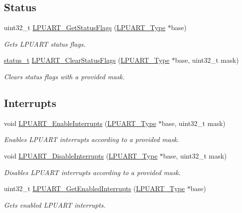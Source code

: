 \subsection*{Status}
\begin{DoxyCompactItemize}
\item 
uint32\+\_\+t \mbox{\hyperlink{group__lpuart__driver_gab83db963591b116f90daf3e24118cb09}{L\+P\+U\+A\+R\+T\+\_\+\+Get\+Status\+Flags}} (\mbox{\hyperlink{struct_l_p_u_a_r_t___type}{L\+P\+U\+A\+R\+T\+\_\+\+Type}} $\ast$base)
\begin{DoxyCompactList}\small\item\em Gets L\+P\+U\+A\+RT status flags. \end{DoxyCompactList}\item 
\mbox{\hyperlink{group__ksdk__common_gaaabdaf7ee58ca7269bd4bf24efcde092}{status\+\_\+t}} \mbox{\hyperlink{group__lpuart__driver_gac6bcdb29d31a2addb8d80d98855ba147}{L\+P\+U\+A\+R\+T\+\_\+\+Clear\+Status\+Flags}} (\mbox{\hyperlink{struct_l_p_u_a_r_t___type}{L\+P\+U\+A\+R\+T\+\_\+\+Type}} $\ast$base, uint32\+\_\+t mask)
\begin{DoxyCompactList}\small\item\em Clears status flags with a provided mask. \end{DoxyCompactList}\end{DoxyCompactItemize}
\subsection*{Interrupts}
\begin{DoxyCompactItemize}
\item 
void \mbox{\hyperlink{group__lpuart__driver_gab5998ebb0dc457f0864c84c16f83d745}{L\+P\+U\+A\+R\+T\+\_\+\+Enable\+Interrupts}} (\mbox{\hyperlink{struct_l_p_u_a_r_t___type}{L\+P\+U\+A\+R\+T\+\_\+\+Type}} $\ast$base, uint32\+\_\+t mask)
\begin{DoxyCompactList}\small\item\em Enables L\+P\+U\+A\+RT interrupts according to a provided mask. \end{DoxyCompactList}\item 
void \mbox{\hyperlink{group__lpuart__driver_ga2540406e4a338199acddaa828829cad8}{L\+P\+U\+A\+R\+T\+\_\+\+Disable\+Interrupts}} (\mbox{\hyperlink{struct_l_p_u_a_r_t___type}{L\+P\+U\+A\+R\+T\+\_\+\+Type}} $\ast$base, uint32\+\_\+t mask)
\begin{DoxyCompactList}\small\item\em Disables L\+P\+U\+A\+RT interrupts according to a provided mask. \end{DoxyCompactList}\item 
uint32\+\_\+t \mbox{\hyperlink{group__lpuart__driver_ga172b524bae8bacc6dc95d9daf82c97b5}{L\+P\+U\+A\+R\+T\+\_\+\+Get\+Enabled\+Interrupts}} (\mbox{\hyperlink{struct_l_p_u_a_r_t___type}{L\+P\+U\+A\+R\+T\+\_\+\+Type}} $\ast$base)
\begin{DoxyCompactList}\small\item\em Gets enabled L\+P\+U\+A\+RT interrupts. \end{DoxyCompactList}\end{DoxyCompactItemize}
